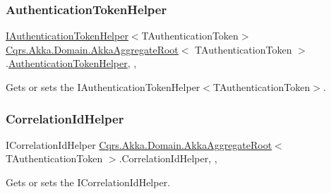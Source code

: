 \subsubsection{\texorpdfstring{Authentication\+Token\+Helper}{AuthenticationTokenHelper}}
{\footnotesize\ttfamily \hyperlink{interfaceCqrs_1_1Authentication_1_1IAuthenticationTokenHelper}{I\+Authentication\+Token\+Helper}$<$T\+Authentication\+Token$>$ \hyperlink{classCqrs_1_1Akka_1_1Domain_1_1AkkaAggregateRoot}{Cqrs.\+Akka.\+Domain.\+Akka\+Aggregate\+Root}$<$ T\+Authentication\+Token $>$.\hyperlink{classCqrs_1_1Authentication_1_1AuthenticationTokenHelper}{Authentication\+Token\+Helper}\hspace{0.3cm}{\ttfamily [get]}, {\ttfamily [set]}, {\ttfamily [protected]}}



Gets or sets the I\+Authentication\+Token\+Helper$<$\+T\+Authentication\+Token$>$. 

\mbox{\label{classCqrs_1_1Akka_1_1Domain_1_1AkkaAggregateRoot_ae1460c9574d7d7b1cb9de2848ae7102e_ae1460c9574d7d7b1cb9de2848ae7102e}} 
\subsubsection{\texorpdfstring{Correlation\+Id\+Helper}{CorrelationIdHelper}}
{\footnotesize\ttfamily I\+Correlation\+Id\+Helper \hyperlink{classCqrs_1_1Akka_1_1Domain_1_1AkkaAggregateRoot}{Cqrs.\+Akka.\+Domain.\+Akka\+Aggregate\+Root}$<$ T\+Authentication\+Token $>$.Correlation\+Id\+Helper\hspace{0.3cm}{\ttfamily [get]}, {\ttfamily [set]}, {\ttfamily [protected]}}



Gets or sets the I\+Correlation\+Id\+Helper. 

\mbox{\label{classCqrs_1_1Akka_1_1Domain_1_1AkkaAggregateRoot_ac03d79efc02629b17642c6324ff181c9_ac03d79efc02629b17642c6324ff181c9}} 
